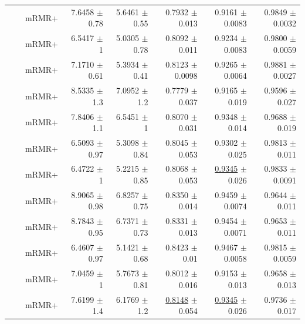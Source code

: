\begin{longtable}{llp{}rrrrr}
 &  & mRMR+ & 7.6458 {\scriptsize $\pm$ 0.78} & 5.6461 {\scriptsize $\pm$ 0.55} & 0.7932 {\scriptsize $\pm$ 0.013} & 0.9161 {\scriptsize $\pm$ 0.0083} & 0.9849 {\scriptsize $\pm$ 0.0032} \\
 &  & mRMR+ & 6.5417 {\scriptsize $\pm$ 1} & 5.0305 {\scriptsize $\pm$ 0.78} & 0.8092 {\scriptsize $\pm$ 0.011} & 0.9234 {\scriptsize $\pm$ 0.0083} & 0.9800 {\scriptsize $\pm$ 0.0059} \\
 &  & mRMR+ & 7.1710 {\scriptsize $\pm$ 0.61} & 5.3934 {\scriptsize $\pm$ 0.41} & 0.8123 {\scriptsize $\pm$ 0.0098} & 0.9265 {\scriptsize $\pm$ 0.0064} & 0.9881 {\scriptsize $\pm$ 0.0027} \\
 &  & mRMR+ & 8.5335 {\scriptsize $\pm$ 1.3} & 7.0952 {\scriptsize $\pm$ 1.2} & 0.7779 {\scriptsize $\pm$ 0.037} & 0.9165 {\scriptsize $\pm$ 0.019} & 0.9596 {\scriptsize $\pm$ 0.027} \\
 &  & mRMR+ & 7.8406 {\scriptsize $\pm$ 1.1} & 6.5451 {\scriptsize $\pm$ 1} & 0.8070 {\scriptsize $\pm$ 0.031} & 0.9348 {\scriptsize $\pm$ 0.014} & 0.9688 {\scriptsize $\pm$ 0.019} \\
 &  & mRMR+ & 6.5093 {\scriptsize $\pm$ 0.97} & 5.3098 {\scriptsize $\pm$ 0.84} & 0.8045 {\scriptsize $\pm$ 0.053} & 0.9302 {\scriptsize $\pm$ 0.025} & 0.9813 {\scriptsize $\pm$ 0.011} \\
 &  & mRMR+ & 6.4722 {\scriptsize $\pm$ 1} & 5.2215 {\scriptsize $\pm$ 0.85} & 0.8068 {\scriptsize $\pm$ 0.053} & \underline{0.9345} {\scriptsize $\pm$ 0.026} & 0.9833 {\scriptsize $\pm$ 0.0091} \\
 &  & mRMR+ & 8.9065 {\scriptsize $\pm$ 0.98} & 6.8257 {\scriptsize $\pm$ 0.75} & 0.8350 {\scriptsize $\pm$ 0.014} & 0.9459 {\scriptsize $\pm$ 0.0074} & 0.9644 {\scriptsize $\pm$ 0.011} \\
 &  & mRMR+ & 8.7843 {\scriptsize $\pm$ 0.95} & 6.7371 {\scriptsize $\pm$ 0.73} & 0.8331 {\scriptsize $\pm$ 0.013} & 0.9454 {\scriptsize $\pm$ 0.0071} & 0.9653 {\scriptsize $\pm$ 0.011} \\
 &  & mRMR+ & 6.4607 {\scriptsize $\pm$ 0.97} & 5.1421 {\scriptsize $\pm$ 0.68} & 0.8423 {\scriptsize $\pm$ 0.01} & 0.9467 {\scriptsize $\pm$ 0.0058} & 0.9815 {\scriptsize $\pm$ 0.0059} \\
 &  & mRMR+ & 7.0459 {\scriptsize $\pm$ 1} & 5.7673 {\scriptsize $\pm$ 0.81} & 0.8012 {\scriptsize $\pm$ 0.016} & 0.9153 {\scriptsize $\pm$ 0.013} & 0.9658 {\scriptsize $\pm$ 0.013} \\
 &  & mRMR+ & 7.6199 {\scriptsize $\pm$ 1.4} & 6.1769 {\scriptsize $\pm$ 1.2} & \underline{0.8148} {\scriptsize $\pm$ 0.054} & \underline{0.9345} {\scriptsize $\pm$ 0.026} & 0.9736 {\scriptsize $\pm$ 0.017} \\

\end{longtable}
